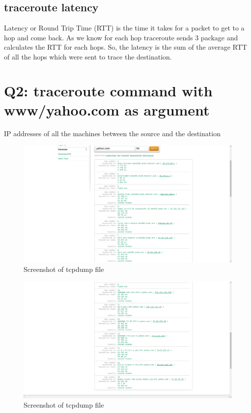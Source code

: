 \documentclass{article}
\begin{document}
\subsection{traceroute latency}
Latency or Round Trip Time (RTT) is the time it takes for a packet
to get to a hop and come back. As we know for each hop traceroute
sends 3 package and calculates the RTT for each hops. So, the latency
is the sum of the average RTT of all the hops which were sent to trace
the destination.

\section{Q2: traceroute command with www/yahoo.com as argument}
IP addresses of all the machines between the source and the destination \\
 \begin{figure}[H]
 \centering
 \includegraphics[width=1.0\textwidth]{Assign3/q2/q2a.png}
 \caption{\label{fig:PING}Screenshot of tcpdump file}
 \end{figure}
 
  \begin{figure}[H]
 \centering
 \includegraphics[width=1.0\textwidth]{Assign3/q2/q2b.png}
 \caption{\label{fig:PING}Screenshot of tcpdump file}
 \end{figure}
\end{document}
